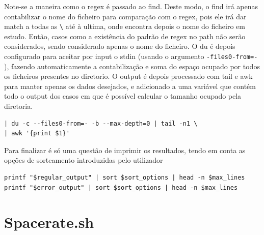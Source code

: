 Note-se a maneira como o regex é passado ao find. Deste
modo, o find irá apenas contabilizar o nome do ficheiro para
comparação com o regex, pois ele irá dar match a todas as
\verb|\| até à ultima, onde encontra depois o nome do
ficheiro em estudo. Então, casos como a existência do padrão
de regex no path não serão considerados, sendo considerado
apenas o nome do ficheiro.
O du é depois configurado para aceitar por input o stdin
(usando o argumento \verb|-files0-from=-| ), fazendo
automaticamente a contabilização e soma do espaço ocupado
por todos os ficheiros presentes no diretorio. O output é
depois processado com tail e awk para manter apenas os dados
desejados, e adicionado a uma variável que contém todo o
output dos casos em que é possível calcular o tamanho
ocupado pela diretoria.
\begin{verbatim}
| du -c --files0-from=- -b --max-depth=0 | tail -n1 \ 
| awk '{print $1}'
\end{verbatim}
Para finalizar é só uma questão de imprimir os resultados,
tendo em conta as opções de sorteamento introduzidas pelo
utilizador
\begin{verbatim}
printf "$regular_output" | sort $sort_options | head -n $max_lines
printf "$error_output" | sort $sort_options | head -n $max_lines
\end{verbatim}

\section{Spacerate.sh}
